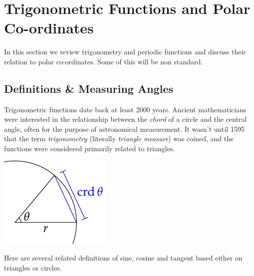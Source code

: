 \graphicspath{{2trig/asy/}}

\section{Trigonometric Functions and Polar Co-ordinates}\label{sec:trig}

In this section we review trigonometry and periodic functions and discuss their relation to polar co-ordinates. Some of this will be non standard.

\subsection{Definitions \& Measuring Angles}\label{ssec:trigdef}

\begin{minipage}[t]{0.75\linewidth}\vspace{-5pt}
Trigonometric functions date back at least 2000 years. Ancient mathematicians were interested in the relationship between the \emph{chord} of a circle and the central angle, often for the purpose of astronomical measurement. It wasn't until 1595 that the term \emph{trigonometry} (literally \emph{triangle measure}) was coined, and the functions were considered primarily related to triangles.
\end{minipage}\begin{minipage}[t]{0.25\linewidth}\vspace{-15pt}
\flushright\includegraphics{defn-chord}
\end{minipage}
\smallbreak

Here are several related definitions of sine, cosine and tangent based either on triangles or circles.


